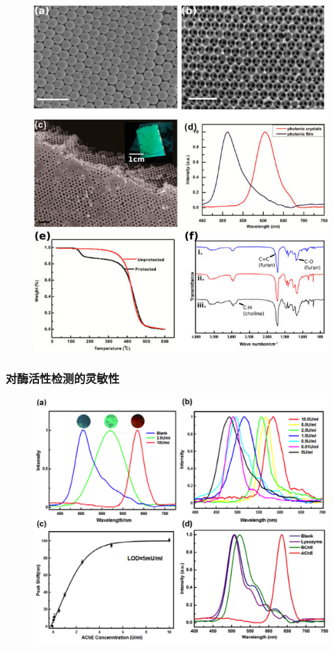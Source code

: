 \documentclass{beamer}
\begin{document}
\begin{frame}
\begin{minipage}{0.48\textwidth}
\begin{figure}[h]
      \includegraphics[width=0.90\linewidth]{figures/material-maleimide.jpg}
    \end{figure}
  \end{minipage} 
\end{frame}


\begin{frame}
  \frametitle{对酶活性检测的灵敏性}
  \begin{figure}[t]
    \centering
    \includegraphics[height=0.60\linewidth]{figures/enzyme_sensitivity.png}
  \end{figure}
\end{frame}
\end{document}
